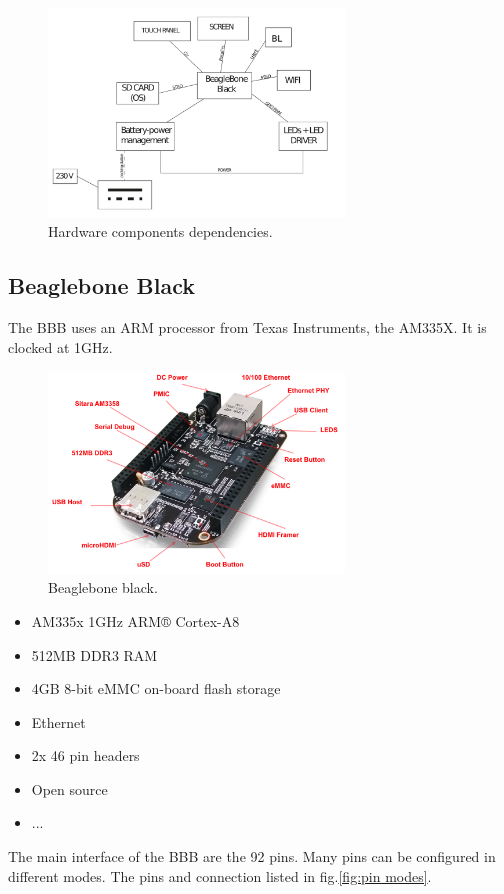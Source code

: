 \begin{figure}[!htb]
    \centering
    \includegraphics[width=0.7\textwidth,keepaspectratio]{chap/hardFig/overall_hardware_dependecies}
    \caption{Hardware components dependencies.}
    \label{fig:hardware dependencies}
\end{figure}


\clearpage

\subsection{Beaglebone Black}
The BBB uses an ARM processor from Texas Instruments, the AM335X. It is clocked at 1GHz.

\begin{figure}[!htb]
    \centering
    \includegraphics[width=0.7\textwidth,keepaspectratio]{chap/hardFig/bbb.png}
    \caption{Beaglebone black.}
    \label{fig:bbb}
\end{figure}

\begin{itemize}
  \item{ AM335x 1GHz ARM® Cortex-A8 }
  \item{512MB DDR3 RAM}
  \item{4GB 8-bit eMMC on-board flash storage}
  \item{Ethernet}
  \item{2x 46 pin headers}
  \item{Open source}
  \item{...}
\end{itemize}
The main interface of the BBB are the 92 pins. Many pins can be configured in different modes. The pins and connection listed in fig.\ref{fig:pin modes}.
\clearpage


